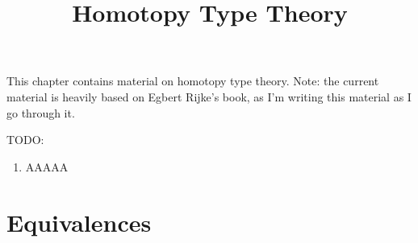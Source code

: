 

%



\title{Homotopy Type Theory}

\maketitle

\label{section-phantom}

This chapter contains material on homotopy type theory. Note: the current material is heavily based on Egbert Rijke's book, as I'm writing this material as I go through it.

\ChapterTableOfContents

TODO:
\begin{enumerate}
    \item AAAAA
\end{enumerate}

\section{Equivalences}\label{section-hott-equivalences}
